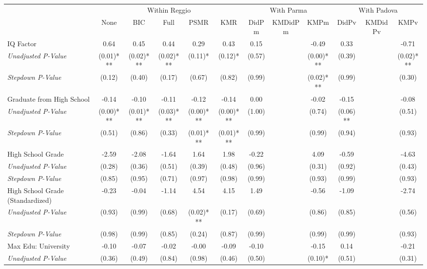 \begin{tabular}{l c c c c c c c c c c c}
\toprule
& \multicolumn{5}{c}{Within Reggio} & \multicolumn{3}{c}{With Parma} & \multicolumn{3}{c}{With Padova} \\\cmidrule(lr){2-6} \cmidrule(lr){7-9} \cmidrule(lr){10-12}
 & None & BIC & Full & PSMR & KMR & DidPm & KMDidPm & KMPm & DidPv & KMDidPv & KMPv \\
\midrule
IQ Factor & 0.64 & 0.45 & 0.44 & 0.29 & 0.43 & 0.15 & & -0.49 & 0.33 & & -0.71 \\
\quad \textit{Unadjusted P-Value} & (0.01)*** & (0.02)*** & (0.02)*** & (0.11)* & (0.12)* & (0.57) & & (0.00)*** & (0.39) & & (0.02)*** \\
\quad \textit{Stepdown P-Value} & (0.12) & (0.40) & (0.17) & (0.67) & (0.82) & (0.99) & & (0.02)*** & (0.99) & & (0.30) \\
Graduate from High School & -0.14 & -0.10 & -0.11 & -0.12 & -0.14 & 0.00 & & -0.02 & -0.15 & & -0.08 \\
\quad \textit{Unadjusted P-Value} & (0.00)*** & (0.01)*** & (0.03)*** & (0.00)*** & (0.00)*** & (1.00) & & (0.74) & (0.06)** & & (0.51) \\
\quad \textit{Stepdown P-Value} & (0.51) & (0.86) & (0.33) & (0.01)*** & (0.01)*** & (0.99) & & (0.99) & (0.94) & & (0.93) \\
High School Grade & -2.59 & -2.08 & -1.64 & 1.64 & 1.98 & -0.22 & & 4.09 & -0.59 & & -4.63 \\
\quad \textit{Unadjusted P-Value} & (0.28) & (0.36) & (0.51) & (0.39) & (0.48) & (0.96) & & (0.31) & (0.92) & & (0.43) \\
\quad \textit{Stepdown P-Value} & (0.85) & (0.95) & (0.71) & (0.97) & (0.98) & (0.99) & & (0.93) & (0.99) & & (0.93) \\
High School Grade (Standardized) & -0.23 & -0.04 & -1.14 & 4.54 & 4.15 & 1.49 & & -0.56 & -1.09 & & -2.74 \\
\quad \textit{Unadjusted P-Value} & (0.93) & (0.99) & (0.68) & (0.02)*** & (0.17) & (0.69) & & (0.86) & (0.85) & & (0.56) \\
\quad \textit{Stepdown P-Value} & (0.98) & (0.99) & (0.85) & (0.24) & (0.87) & (0.99) & & (0.99) & (0.99) & & (0.93) \\
Max Edu: University & -0.10 & -0.07 & -0.02 & -0.00 & -0.09 & -0.10 & & -0.15 & 0.14 & & -0.21 \\
\quad \textit{Unadjusted P-Value} & (0.36) & (0.49) & (0.84) & (0.98) & (0.46) & (0.50) & & (0.10)* & (0.51) & & (0.31) \\

\end{tabular}
